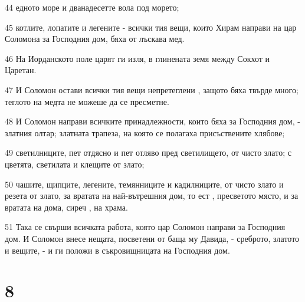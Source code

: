 \par 44 едното море и дванадесетте вола под морето;
\par 45 котлите, лопатите и легените - всички тия вещи, които Хирам направи на цар Соломона за Господния дом, бяха от лъскава мед.
\par 46 На Иорданското поле царят ги изля, в глинената земя между Сокхот и Царетан.
\par 47 И Соломон остави всички тия вещи непретеглени , защото бяха твърде много; теглото на медта не можеше да се пресметне.
\par 48 И Соломон направи всичките принадлежности, които бяха за Господния дом, - златния олтар; златната трапеза, на която се полагаха присъствените хлябове;
\par 49 светилниците, пет отдясно и пет отляво пред светилището, от чисто злато; с цветята, светилата и клещите от злато;
\par 50 чашите, щипците, легените, темянниците и кадилниците, от чисто злато и резета от злато, за вратата на най-вътрешния дом, то ест , пресветото място, и за вратата на дома, сиреч , на храма.
\par 51 Така се свърши всичката работа, която цар Соломон направи за Господния дом. И Соломон внесе нещата, посветени от баща му Давида, - среброто, златото и вещите, - и ги положи в съкровищницата на Господния дом.

\chapter{8}

